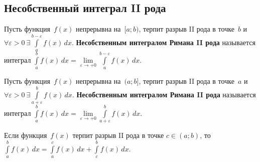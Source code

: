 \subsection{Несобственный интеграл II рода}
Пусть функция~$f(x)$ непрерывна на~$[a; b)$, терпит разрыв II рода в точке~$b$ и $\forall \varepsilon > 0 \ \exists \int\limits_a^{b-\varepsilon} f(x)\,dx$.
\textbf{Несобственным интегралом Римана II рода} называется интеграл $\int\limits_a^b f(x)\,dx = \lim\limits_{\varepsilon \to +0} \int\limits_a^{b-\varepsilon} f(x)\,dx$.

Пусть функция~$f(x)$ непрерывна на~$(a; b]$, терпит разрыв II рода в точке~$a$ и $\forall \varepsilon > 0 \ \exists \int\limits_{a+\varepsilon}^b f(x)\,dx$.
\textbf{Несобственным интегралом Римана II рода} называется интеграл $\int\limits_a^b f(x)\,dx = \lim\limits_{\varepsilon \to +0} \int\limits_{a+\varepsilon}^b f(x)\,dx$.

Если функция~$f(x)$ терпит разрыв II рода в точке $c \in (a; b)$, то $\int\limits_a^b f(x)\,dx = \int\limits_a^c f(x)\,dx + \int\limits_c^b f(x)\,dx$.